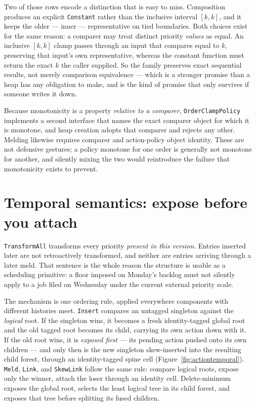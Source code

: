 \documentclass[11pt,twoside,openright]{book}
\newcommand{\code}[1]{\texorpdfstring{\textcolor{d7ink}{\texttt{#1}}}{#1}}
\begin{document}
\noindent
Two of those rows encode a distinction that is easy to miss. Composition
produces an explicit \code{Constant} rather than the inclusive interval
$[k, k]$, and it keeps the older --- inner --- representative on tied
boundaries. Both choices exist for the same reason: a comparer may treat
distinct priority \emph{values} as equal. An inclusive $[k, k]$ clamp passes
through an input that compares equal to $k$, preserving that input's own
representative, whereas the constant function must return the exact $k$ the
caller supplied. So the family preserves exact sequential results, not merely
comparison equivalence --- which is a stronger promise than a heap has any
obligation to make, and is the kind of promise that only survives if someone
writes it down.

Because monotonicity is a property \emph{relative to a comparer},
\code{OrderClampPolicy} implements a second interface that names the exact
comparer object for which it is monotone, and heap creation adopts that comparer
and rejects any other. Melding likewise requires comparer and action-policy
object identity. These are not defensive gestures; a policy monotone for one
order is generally not monotone for another, and silently mixing the two would
reintroduce the failure that monotonicity exists to prevent.

\section{Temporal semantics: expose before you attach}

\code{TransformAll} transforms every priority \emph{present in this version}.
Entries inserted later are not retroactively transformed, and neither are
entries arriving through a later meld. That sentence is the whole reason the
structure is usable as a scheduling primitive: a floor imposed on Monday's
backlog must not silently apply to a job filed on Wednesday under the current
external priority scale.

The mechanism is one ordering rule, applied everywhere components with different
histories meet. \code{Insert} compares an untagged singleton against the
\emph{logical} root. If the singleton wins, it becomes a fresh identity-tagged
global root and the old tagged root becomes its child, carrying its own action
down with it. If the old root wins, it is \emph{exposed first} --- its pending
action pushed onto its own children --- and only then is the new singleton
skew-inserted into the resulting child forest, through an identity-tagged spine
cell (Figure~\ref{fig:actiontemporal}). \code{Meld}, \code{Link}, and
\code{SkewLink} follow the same rule: compare logical roots, expose only the
winner, attach the loser through an identity cell. Delete-minimum exposes the
global root, selects the least logical tree in its child forest, and exposes
that tree before splitting its fused children.
\end{document}
